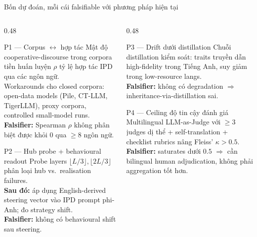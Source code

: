 \documentclass[11pt,aspectratio=169]{beamer}
\begin{document}
\begin{frame}{Bốn dự đoán, mỗi cái falsifiable với phương pháp hiện tại}
    \begin{columns}[T]
        \begin{column}{0.48\textwidth}
            \begin{block}{P1 --- Corpus $\leftrightarrow$ hợp tác}
                \footnotesize Mật độ cooperative-discourse trong corpora tiền huấn luyện $\rho$ tỷ lệ hợp tác IPD qua các ngôn ngữ.\\
                Workarounds cho closed corpora: open-data models (Pile, CT-LLM, TigerLLM), proxy corpora, controlled small-model runs.\\[4pt]
                \textbf{Falsifier:} Spearman $\rho$ không phân biệt được khỏi 0 qua $\geq 8$ ngôn ngữ.
            \end{block}
            \vspace{0.2cm}
            \begin{block}{P2 --- Hub probe + behavioural readout}
                \footnotesize Probe layers $\lfloor L/3 \rfloor, \lfloor 2L/3 \rfloor$ phân loại hub vs.\ realisation failures.\\
                \textbf{Sau đó:} áp dụng English-derived steering vector vào IPD prompt phi-Anh; đo strategy shift.\\[4pt]
                \textbf{Falsifier:} không có behavioural shift sau steering.
            \end{block}
        \end{column}
        \begin{column}{0.48\textwidth}
            \begin{block}{P3 --- Drift dưới distillation}
                \footnotesize Chuỗi distillation kiểm soát: traits truyền dẫn high-fidelity trong Tiếng Anh, suy giảm trong low-resource langs.\\[4pt]
                \textbf{Falsifier:} không có degradation $\Rightarrow$ inheritance-via-distillation sai.
            \end{block}
            \vspace{0.2cm}
            \begin{block}{P4 --- Ceiling độ tin cậy đánh giá}
                \footnotesize Multilingual LLM-as-Judge với $\geq 3$ judges dị thể + self-translation + checklist rubrics nâng Fleiss' $\kappa > 0.5$.\\[4pt]
                \textbf{Falsifier:} saturates dưới $0.5$ $\Rightarrow$ cần bilingual human adjudication, không phải aggregation tốt hơn.
            \end{block}
        \end{column}
    \end{columns}
\end{frame}
\end{document}

